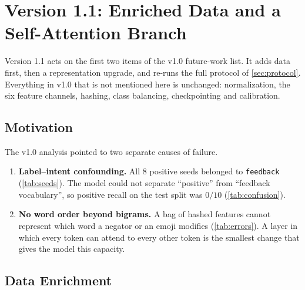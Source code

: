 \documentclass[11pt,a4paper]{article}
\theoremstyle{remark}
\newcommand{\lbl}[1]{\texttt{#1}}                      %
\begin{document}
\section{Version 1.1: Enriched Data and a Self-Attention Branch}
\label{sec:v11}

Version 1.1 acts on the first two items of the v1.0 future-work list. It adds
data first, then a representation upgrade, and re-runs the full protocol of
\cref{sec:protocol}. Everything in v1.0 that is not mentioned here is
unchanged: normalization, the six feature channels, hashing, class balancing,
checkpointing and calibration.

\subsection{Motivation}
The v1.0 analysis pointed to two separate causes of failure.
\begin{enumerate}
  \item \textbf{Label--intent confounding.} All 8 positive seeds belonged to
        \lbl{feedback} (\cref{tab:seeds}). The model could not separate
        ``positive'' from ``feedback vocabulary'', so positive recall on the
        test split was $0/10$ (\cref{tab:confusion}).
  \item \textbf{No word order beyond bigrams.} A bag of hashed features cannot
        represent which word a negator or an emoji modifies
        (\cref{tab:errors}). A layer in which every token can attend to every
        other token is the smallest change that gives the model this
        capacity.
\end{enumerate}

\subsection{Data Enrichment}
\label{sec:v11data}
\end{document}
